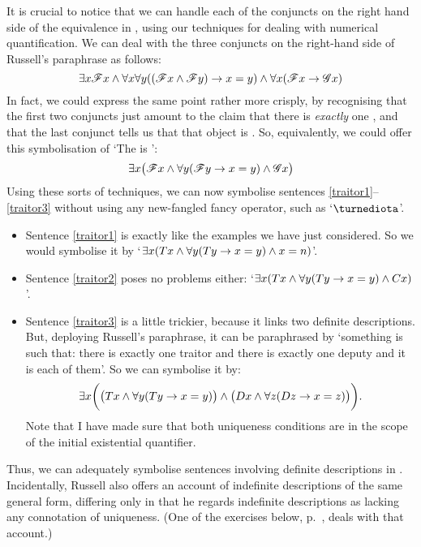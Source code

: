 It is crucial to notice that we can handle each of the conjuncts on the right hand side of the equivalence in \FOL, using our techniques for dealing with numerical quantification.  We can deal with the three conjuncts on the right-hand side of Russell's paraphrase as follows:
	$$\exists x \mathscr{F}x \wedge \forall x \forall y ((\mathscr{F}x \wedge \mathscr{F}y) \rightarrow x = y) \wedge \forall x (\mathscr{F}x \rightarrow \mathscr{G}x)$$
In fact, we could express the same point rather more crisply, by recognising that the first two conjuncts just amount to the claim that there is \emph{exactly} one , and that the last conjunct tells us that that object is . So, equivalently, we could offer this symbolisation of `The  is ':
	$$\exists x \bigl(\mathscr{F}x \wedge \forall y (\mathscr{F}y \rightarrow x = y) \wedge \mathscr{G}x\bigr)$$
Using these sorts of techniques, we can now symbolise sentences \ref{traitor1}–\ref{traitor3} without using any new-fangled fancy operator, such as `$\maththe$'. 
\begin{itemize}
	\item Sentence \ref{traitor1} is exactly like the examples we have just considered. So we would symbolise it by `$\exists x (Tx \wedge \forall y(Ty \rightarrow x = y) \wedge x = n)$'. 
\item Sentence \ref{traitor2} poses no problems either: `$\exists x (Tx \wedge \forall y(Ty \rightarrow x = y) \wedge Cx)$'.
\item Sentence \ref{traitor3} is a little trickier, because it links two definite descriptions. But, deploying  Russell's paraphrase, it can be paraphrased by `something is such that: there is exactly one traitor and there is exactly one deputy and it is each of them'. So we can symbolise it by: $$\exists x\biggl(\bigl(Tx \wedge \forall y(Ty \rightarrow x = y) \bigr) \wedge \bigl(Dx \wedge \forall z(Dz \rightarrow x = z) \bigr)\biggr).$$ Note that I have made sure that both uniqueness conditions are in the scope of the initial existential quantifier.
\end{itemize} Thus, we can adequately symbolise sentences involving definite descriptions in \FOL. Incidentally, Russell also offers an account of indefinite descriptions of the same general form, differing only in that he regards indefinite descriptions as lacking any connotation of uniqueness. (One of the exercises below, p.\ \pageref{indefs}, deals with that account.)

